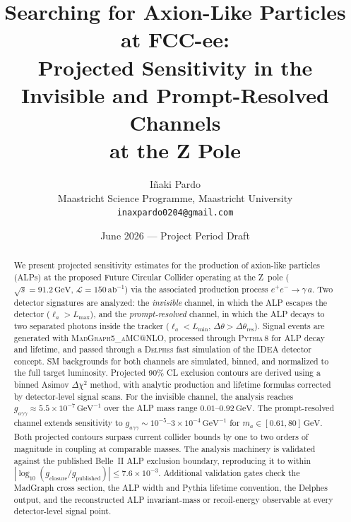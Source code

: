 \documentclass[12pt,a4paper]{article}
\begin{document}
\title{\textbf{Searching for Axion-Like Particles at FCC-ee:\\
    Projected Sensitivity in the Invisible and Prompt-Resolved Channels\\
    at the Z Pole}}

\author{Iñaki Pardo\\
    \small Maastricht Science Programme, Maastricht University\\
    \small \texttt{inaxpardo0204@gmail.com}}

\date{June 2026 — Project Period Draft}
\maketitle

\begin{abstract}
We present projected sensitivity estimates for the production of axion-like
particles (ALPs) at the proposed Future Circular Collider operating at the
Z~pole ($\sqrt{s} = 91.2\,\text{GeV}$, $\mathcal{L} = 150\,\text{ab}^{-1}$) via the associated
production process $e^+e^- \to \gamma\,a$.
Two detector signatures are analyzed: the \emph{invisible} channel, in which
the ALP escapes the detector ($\ell_a > L_\mathrm{max}$), and the
\emph{prompt-resolved} channel, in which the ALP decays to two separated
photons inside the tracker ($\ell_a < L_\mathrm{min}$,
$\Delta\theta > \Delta\theta_\mathrm{res}$).
Signal events are generated with \textsc{MadGraph5\_{aMC@NLO}}, processed
through \textsc{Pythia\,8} for ALP decay and lifetime, and passed through
a \textsc{Delphes} fast simulation of the IDEA detector concept.
SM backgrounds for both channels are simulated, binned, and normalized to the
full target luminosity.
Projected 90\% CL exclusion contours are derived using a binned
Asimov $\Delta\chi^2$ method, with analytic production and lifetime formulas corrected
by detector-level signal scans.
For the invisible channel, the analysis reaches
$g_{a\gamma\gamma} \approx 5.5\times10^{-7}\,\text{GeV}^{-1}$ over the ALP mass range
$0.01\text{--}0.92\,\text{GeV}$.
The prompt-resolved channel extends sensitivity to
$g_{a\gamma\gamma} \sim 10^{-5}\text{--}3\times10^{-4}\,\text{GeV}^{-1}$ for
$m_{a} \in [0.61, 80]\,\text{GeV}$.
Both projected contours surpass current collider bounds by one to two orders
of magnitude in coupling at comparable masses.
The analysis machinery is validated against the published Belle~II
ALP exclusion boundary, reproducing it to within
$|\log_{10}(g_\mathrm{closure}/g_\mathrm{published})| \leq 7.6\times10^{-3}$.
Additional validation gates check the MadGraph cross section, the ALP width and
Pythia lifetime convention, the Delphes output, and the reconstructed ALP
invariant-mass or recoil-energy observable at every detector-level signal point.
\end{abstract}
\end{document}
